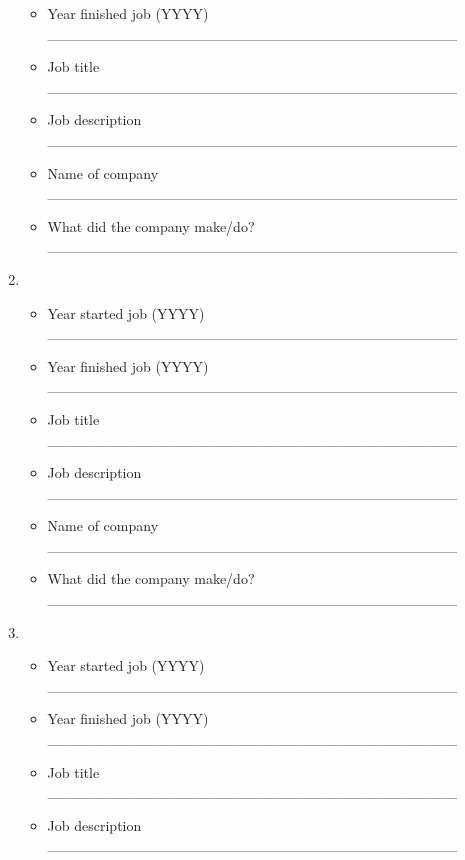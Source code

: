 \documentclass[a4paper,10pt]{article}
\begin{document}
\begin{enumerate}
\begin{itemize}
         \item Year finished job (YYYY) \_\_\_\_\_\_\_\_\_\_\_\_\_\_\_\_\_\_\_\_\_\_\_\_\_\_\_\_\_\_\_\_\_\_\_\_\_\_\_
         \item Job title \_\_\_\_\_\_\_\_\_\_\_\_\_\_\_\_\_\_\_\_\_\_\_\_\_\_\_\_\_\_\_\_\_\_\_\_\_\_\_
         \item Job description \_\_\_\_\_\_\_\_\_\_\_\_\_\_\_\_\_\_\_\_\_\_\_\_\_\_\_\_\_\_\_\_\_\_\_\_\_\_\_
         \item Name of company \_\_\_\_\_\_\_\_\_\_\_\_\_\_\_\_\_\_\_\_\_\_\_\_\_\_\_\_\_\_\_\_\_\_\_\_\_\_\_
         \item What did the company make/do? \_\_\_\_\_\_\_\_\_\_\_\_\_\_\_\_\_\_\_\_\_\_\_\_\_\_\_\_\_\_\_\_\_\_\_\_\_\_\_
      \end{itemize}
 \item
     \begin{itemize}
         \item Year started job (YYYY) \_\_\_\_\_\_\_\_\_\_\_\_\_\_\_\_\_\_\_\_\_\_\_\_\_\_\_\_\_\_\_\_\_\_\_\_\_\_\_ 
         \item Year finished job (YYYY) \_\_\_\_\_\_\_\_\_\_\_\_\_\_\_\_\_\_\_\_\_\_\_\_\_\_\_\_\_\_\_\_\_\_\_\_\_\_\_
         \item Job title \_\_\_\_\_\_\_\_\_\_\_\_\_\_\_\_\_\_\_\_\_\_\_\_\_\_\_\_\_\_\_\_\_\_\_\_\_\_\_
         \item Job description \_\_\_\_\_\_\_\_\_\_\_\_\_\_\_\_\_\_\_\_\_\_\_\_\_\_\_\_\_\_\_\_\_\_\_\_\_\_\_
         \item Name of company \_\_\_\_\_\_\_\_\_\_\_\_\_\_\_\_\_\_\_\_\_\_\_\_\_\_\_\_\_\_\_\_\_\_\_\_\_\_\_
         \item What did the company make/do? \_\_\_\_\_\_\_\_\_\_\_\_\_\_\_\_\_\_\_\_\_\_\_\_\_\_\_\_\_\_\_\_\_\_\_\_\_\_\_
      \end{itemize}
 \item
     \begin{itemize}
         \item Year started job (YYYY) \_\_\_\_\_\_\_\_\_\_\_\_\_\_\_\_\_\_\_\_\_\_\_\_\_\_\_\_\_\_\_\_\_\_\_\_\_\_\_ 
         \item Year finished job (YYYY) \_\_\_\_\_\_\_\_\_\_\_\_\_\_\_\_\_\_\_\_\_\_\_\_\_\_\_\_\_\_\_\_\_\_\_\_\_\_\_
         \item Job title \_\_\_\_\_\_\_\_\_\_\_\_\_\_\_\_\_\_\_\_\_\_\_\_\_\_\_\_\_\_\_\_\_\_\_\_\_\_\_
         \item Job description \_\_\_\_\_\_\_\_\_\_\_\_\_\_\_\_\_\_\_\_\_\_\_\_\_\_\_\_\_\_\_\_\_\_\_\_\_\_\_

\end{itemize}
\end{enumerate}
\end{document}
